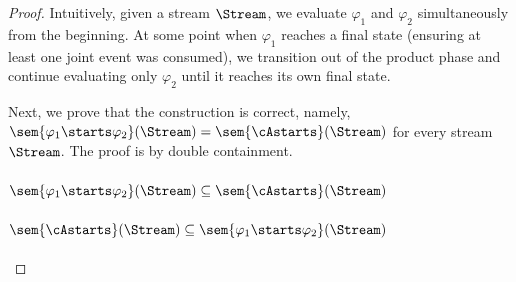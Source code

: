 \begin{proof}
	Intuitively, given a stream $\Stream$, we evaluate $\varphi_1$ and $\varphi_2$ simultaneously from the beginning. At some point when $\varphi_1$ reaches a final state (ensuring at least one joint event was consumed), we transition out of the product phase and continue evaluating only $\varphi_2$ until it reaches its own final state.
	
	Next, we prove that the construction is correct, namely, $\sem{\varphi_1 \starts \varphi_2}(\Stream) = \sem{\cAstarts}(\Stream)$ for every stream $\Stream$. The proof is by double containment.
	
	\paragraph{$\sem{\varphi_1 \starts \varphi_2}(\Stream) \subseteq \sem{\cAstarts}(\Stream)$}
	
	\paragraph{$\sem{\cAstarts}(\Stream) \subseteq \sem{\varphi_1 \starts \varphi_2}(\Stream)$}
\end{proof}